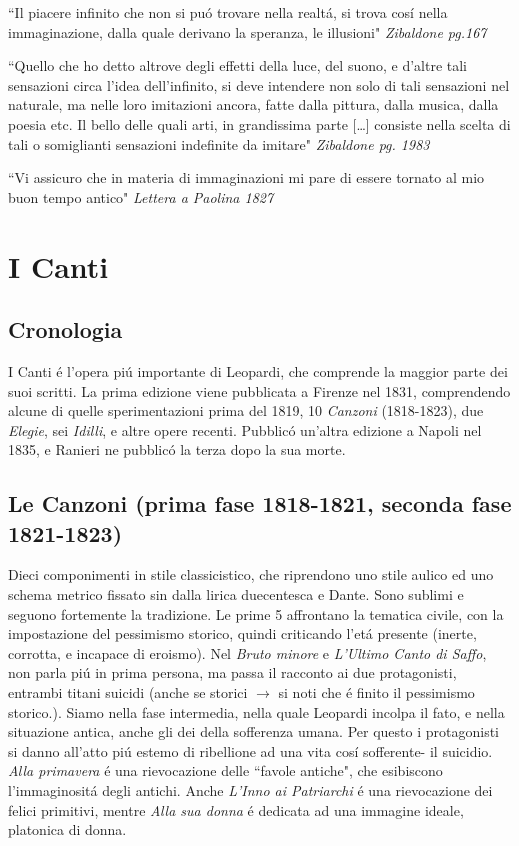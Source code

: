 \documentclass{report}
\begin{document}
``Il piacere infinito che non si puó trovare nella realtá, si trova cosí nella immaginazione, dalla quale derivano la speranza, le illusioni" \emph{Zibaldone pg.167}

``Quello che ho detto altrove degli effetti della luce, del suono, e d'altre tali sensazioni circa l'idea dell'infinito, si deve intendere non solo di tali sensazioni nel naturale, ma nelle loro imitazioni ancora, fatte dalla pittura, dalla musica, dalla poesia etc. Il bello delle quali arti, in grandissima parte [\dots] consiste nella scelta di tali o somiglianti sensazioni indefinite da imitare" \emph{Zibaldone pg. 1983}

``Vi assicuro che in materia di immaginazioni mi pare di essere tornato al mio buon tempo antico" \emph{Lettera a Paolina 1827}
\section{I Canti}
\subsection*{Cronologia}
I Canti é l'opera piú importante di Leopardi, che comprende la maggior parte dei suoi scritti. La prima edizione viene pubblicata a Firenze nel 1831, comprendendo alcune di quelle sperimentazioni prima del 1819, 10 \emph{Canzoni} (1818-1823), due \emph{Elegie}, sei \emph{Idilli}, e altre opere recenti. Pubblicó un'altra edizione a Napoli nel 1835, e Ranieri ne pubblicó la terza dopo la sua morte.
\subsection*{Le Canzoni (prima fase 1818-1821, seconda fase 1821-1823)}
Dieci componimenti in stile classicistico, che riprendono uno stile aulico ed uno schema metrico fissato sin dalla lirica duecentesca e Dante. Sono sublimi e seguono fortemente la tradizione. Le prime 5 affrontano la tematica civile, con la impostazione del pessimismo storico, quindi criticando l'etá presente (inerte, corrotta, e incapace di eroismo). Nel \emph{Bruto minore} e \emph{L'Ultimo Canto di Saffo}, non parla piú in prima persona, ma passa il racconto ai due protagonisti, entrambi titani suicidi (anche se storici $\to$ si noti che é finito il pessimismo storico.). Siamo nella fase intermedia, nella quale Leopardi incolpa il fato, e nella situazione antica, anche gli dei della sofferenza umana. Per questo i protagonisti si danno all'atto piú estemo di ribellione ad una vita cosí sofferente- il suicidio. \emph{Alla primavera} é una rievocazione delle ``favole antiche", che esibiscono l'immaginositá degli antichi. Anche \emph{L'Inno ai Patriarchi} é una rievocazione dei felici primitivi, mentre \emph{Alla sua donna} é dedicata ad una immagine ideale, platonica di donna.
\end{document}

